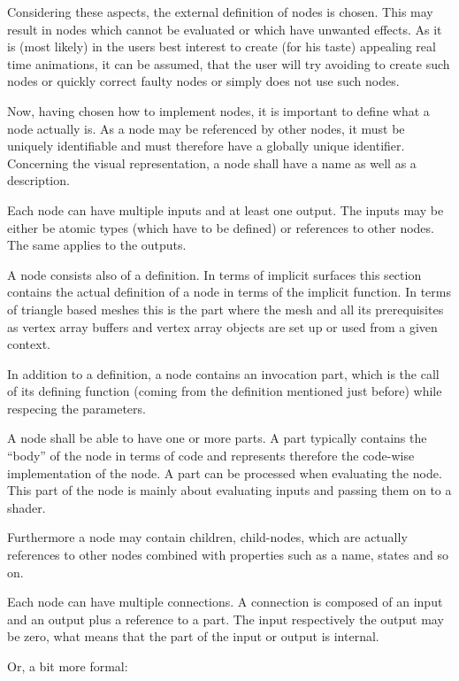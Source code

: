 \documentclass[
    a4paper,      %
    10pt,         %
    openright,    %
    notitlepage,  %
    parskip=half, %
]{scrreprt}       %
\theoremstyle{definition}                    %
\begin{document}
Considering these aspects, the external definition of nodes is chosen. This may
result in nodes which cannot be evaluated or which have unwanted effects. As it
is (most likely) in the users best interest to create (for his taste) appealing
real time animations, it can be assumed, that the user will try avoiding to
create such nodes or quickly correct faulty nodes or simply does not use such
nodes.

Now, having chosen how to implement nodes, it is important to define what a node
actually is. As a node may be referenced by other nodes, it must be uniquely
identifiable and must therefore have a globally unique identifier. Concerning
the visual representation, a node shall have a name as well as a description.

Each node can have multiple inputs and at least one output. The inputs may be
either be atomic types (which have to be defined) or references to other nodes.
The same applies to the outputs.

A node consists also of a definition. In terms of implicit surfaces this
section contains the actual definition of a node in terms of the implicit
function. In terms of triangle based meshes this is the part where the mesh and
all its prerequisites as vertex array buffers and vertex array objects are set
up or used from a given context.

In addition to a definition, a node contains an invocation part, which is the
call of its defining function (coming from the definition mentioned just
before) while respecing the parameters.

A node shall be able to have one or more parts. A part typically contains the
\enquote{body} of the node in terms of code and represents therefore the code-wise
implementation of the node. A part can be processed when evaluating the node.
This part of the node is mainly about evaluating inputs and passing them on to
a shader.

Furthermore a node may contain children, child-nodes, which are actually
references to other nodes combined with properties such as a name, states and so
on.

Each node can have multiple connections. A connection is composed of an input
and an output plus a reference to a part.
The input respectively the output may be zero, what means that the part of the
input or output is internal.

Or, a bit more formal:
\end{document}
